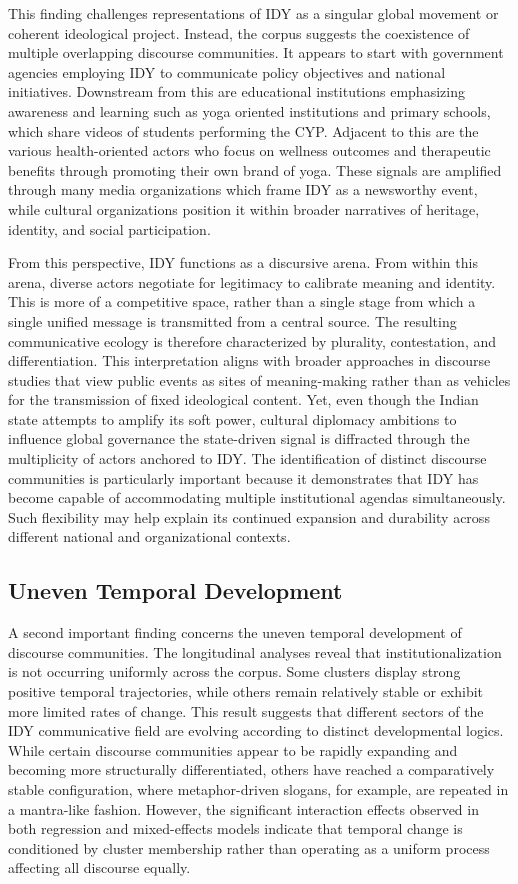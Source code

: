 \documentclass[11pt]{article}
\begin{document}
This finding challenges representations of IDY as a singular global movement or coherent ideological project. Instead, the corpus suggests the coexistence of multiple overlapping discourse communities. It appears to start with government agencies employing IDY to communicate policy objectives and national initiatives. Downstream from this are educational institutions emphasizing awareness and learning such as yoga oriented institutions and primary schools, which share videos of students performing the CYP. Adjacent to this are the various health-oriented actors who focus on wellness outcomes and therapeutic benefits through promoting their own brand of yoga. These signals are amplified through many media organizations which frame IDY as a newsworthy event, while cultural organizations position it within broader narratives of heritage, identity, and social participation.

From this perspective, IDY functions as a discursive arena. From within this arena, diverse actors negotiate for legitimacy to calibrate meaning and identity. This is more of a competitive space, rather than a single stage from which a single unified message is transmitted from a central source. The resulting communicative ecology is therefore characterized by plurality, contestation, and differentiation. This interpretation aligns with broader approaches in discourse studies that view public events as sites of meaning-making rather than as vehicles for the transmission of fixed ideological content. Yet, even though the Indian state attempts to amplify its soft power, cultural diplomacy ambitions to influence global governance the state-driven signal is diffracted through the multiplicity of actors anchored to IDY. The identification of distinct discourse communities is particularly important because it demonstrates that IDY has become capable of accommodating multiple institutional agendas simultaneously. Such flexibility may help explain its continued expansion and durability across different national and organizational contexts.


\subsection{Uneven Temporal Development}

A second important finding concerns the uneven temporal development of discourse communities. The longitudinal analyses reveal that institutionalization is not occurring uniformly across the corpus. Some clusters display strong positive temporal trajectories, while others remain relatively stable or exhibit more limited rates of change. This result suggests that different sectors of the IDY communicative field are evolving according to distinct developmental logics. While certain discourse communities appear to be rapidly expanding and becoming more structurally differentiated, others have reached a comparatively stable configuration, where metaphor-driven slogans, for example, are repeated in a mantra-like fashion. However, the significant interaction effects observed in both regression and mixed-effects models indicate that temporal change is conditioned by cluster membership rather than operating as a uniform process affecting all discourse equally.
\end{document}
